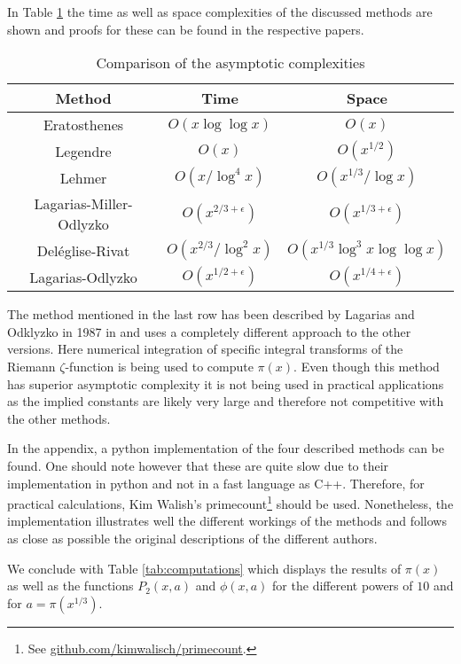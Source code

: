 In Table \ref{tab:runtime} the time as well as space complexities of the discussed methods are shown and proofs for
these can be found in the respective papers.
\begin{table}[htpb]
	\centering
	\begin{tabular}{|c|c|c|}
		\hline
		Method & Time & Space\\ \hline
		Eratosthenes & $O(x \log \log x)$ & $O(x)$ \\
		Legendre &  $O(x)$ &  $O(x^{1 / 2})$ \\
		Lehmer & $O(x / \log^{4} x)$ & $O(x^{1 / 3} / \log x)$\\
		Lagarias-Miller-Odlyzko & $O(x^{2 /3 + \epsilon})$ & $O(x^{1 /3 + \epsilon})$ \\
		Deléglise-Rivat & $O(x^{2 /3} / \log^2 x)$ & $O(x^{1 / 3} \log^3 x \log \log x)$\\
		Lagarias-Odlyzko & $O(x^{1 /2 + \epsilon})$ & $O(x^{1 / 4 + \epsilon})$ \\\hline
	\end{tabular}
	\caption{Comparison of the asymptotic complexities}
	\label{tab:runtime}
\end{table}

The method mentioned in the last row has been described by Lagarias and Odklyzko in 1987 in \cite{lagarias87} and uses a completely different approach to
the other versions. Here numerical integration of specific integral transforms of the Riemann $\zeta$-function is being used to compute $ \pi(x)$.
Even though this method has superior asymptotic complexity it is not being used in practical applications as the implied constants are likely very large
and therefore not competitive with the other methods.

In the appendix, a python implementation of the four described methods can be found. One should note however
that these are quite slow due to their implementation in python and not in a fast language as C++.
Therefore, for practical calculations, Kim Walish's primecount\footnote{See \url{github.com/kimwalisch/primecount}.}
should be used. Nonetheless, the implementation
illustrates well the different workings of the methods and follows as close as possible the 
original descriptions of the different authors.

We conclude with Table \ref{tab:computations} which displays the results of $\pi(x)$ as well as the functions $P_2(x,a)$ and $\phi(x,a)$ 
for the different powers of $10$ and for $a = \pi(x^{1 / 3})$.

